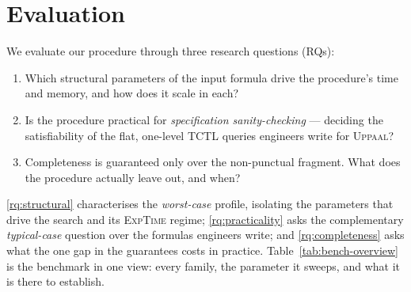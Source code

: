 \section{Evaluation}\label{sec:eval}

We evaluate our procedure through three research questions (RQs):

\begin{enumerate}[start=1,label={\bfseries RQ\arabic*:}, itemindent=2em, ref=\bfseries RQ\arabic*, itemsep=0.1em]
\item \label{rq:structural} Which structural parameters of the input formula drive the procedure's
time and memory, and how does it scale in each?
\item \label{rq:practicality} Is the procedure practical for \emph{specification sanity-checking} ---
deciding the satisfiability of the flat, one-level TCTL queries engineers write for \textsc{Uppaal}?
\item \label{rq:completeness} Completeness is guaranteed only over the non-punctual fragment. What
does the procedure actually leave out, and when?
\end{enumerate}

\noindent
\ref{rq:structural} characterises the \emph{worst-case} profile, isolating the parameters that drive
the search and its \textsc{ExpTime} regime; \ref{rq:practicality} asks the complementary
\emph{typical-case} question over the formulas engineers write; and \ref{rq:completeness} asks what
the one gap in the guarantees costs in practice. Table~\ref{tab:bench-overview} is the benchmark in
one view: every family, the parameter it sweeps, and what it is there to establish.

